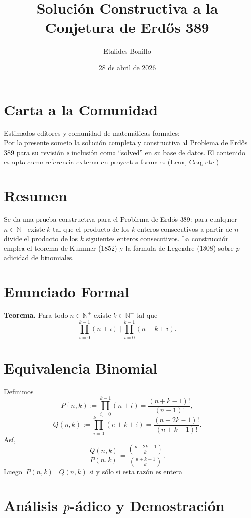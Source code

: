 \documentclass[12pt]{article}
\title{Solución Constructiva a la Conjetura de Erdős 389}
\author{Etalides Bonillo}
\date{28 de abril de 2026}
\begin{document}
\maketitle

\section*{Carta a la Comunidad}

Estimados editores y comunidad de matemáticas formales:\\

Por la presente someto la solución completa y constructiva al Problema de Erdős 389 para su revisión e inclusión como ``solved'' en su base de datos. El contenido es apto como referencia externa en proyectos formales (Lean, Coq, etc.).

\section*{Resumen}

Se da una prueba constructiva para el Problema de Erdős 389: para cualquier $n \in \mathbb{N}^+$ existe $k$ tal que el producto de los $k$ enteros consecutivos a partir de $n$ divide el producto de los $k$ siguientes enteros consecutivos. La construcción emplea el teorema de Kummer (1852) y la fórmula de Legendre (1808) sobre $p$-adicidad de binomiales.

\section*{Enunciado Formal}

\textbf{Teorema.} Para todo $n \in \mathbb{N}^+$ existe $k \in \mathbb{N}^+$ tal que
\[
\prod_{i=0}^{k-1} (n + i)\ \Big|\ \prod_{i=0}^{k-1} (n + k + i).
\]

\section*{Equivalencia Binomial}

Definimos
\[
P(n, k) := \prod_{i=0}^{k-1} (n+i) = \frac{(n+k-1)!}{(n-1)!},
\]
\[
Q(n, k) := \prod_{i=0}^{k-1} (n+k+i) = \frac{(n+2k-1)!}{(n+k-1)!}.
\]
Así,
\[
\frac{Q(n, k)}{P(n, k)} = \frac{\binom{n+2k-1}{k}}{\binom{n+k-1}{k}}.
\]
Luego, $P(n,k) \mid Q(n,k)$ si y sólo si esta razón es entera.

\section*{Análisis $p$-ádico y Demostración}
\end{document}
